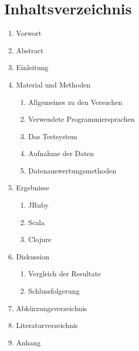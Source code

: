 \documentclass{fancydocument}
\begin{document}
\section*{Inhaltsverzeichnis}
\begin{enumerate}
	\item Vorwort
	\item Abstract
	\item Einleitung
	\item Material und Methoden
	\begin{enumerate}[4.1]
		\item Allgemeines zu den Versuchen
		\item Verwendete Programmiersprachen
		\item Das Testsystem
		\item Aufnahme der Daten
		\item Datenauswertungsmethoden
	\end{enumerate}
	\item Ergebnisse
	\begin{enumerate}[5.1]
		\item JRuby
		\item Scala
		\item Clojure
	\end{enumerate}
	\item Diskussion
	\begin{enumerate}[6.1]
		\item Vergleich der Resultate
		\item Schlussfolgerung
	\end{enumerate}
	\item Abkürzungsverzeichnis
	\item Literaturverzeichnis
	\item Anhang	
\end{enumerate}

\end{document}
